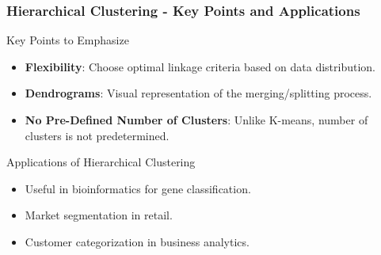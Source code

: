 \documentclass[aspectratio=169]{beamer}
\begin{document}
\begin{frame}[fragile]
  \frametitle{Hierarchical Clustering - Key Points and Applications}
  \begin{block}{Key Points to Emphasize}
    \begin{itemize}
      \item \textbf{Flexibility}: Choose optimal linkage criteria based on data distribution.
      \item \textbf{Dendrograms}: Visual representation of the merging/splitting process.
      \item \textbf{No Pre-Defined Number of Clusters}: Unlike K-means, number of clusters is not predetermined.
    \end{itemize}
  \end{block}

  \begin{block}{Applications of Hierarchical Clustering}
    \begin{itemize}
      \item Useful in bioinformatics for gene classification.
      \item Market segmentation in retail.
      \item Customer categorization in business analytics.
    \end{itemize}
  \end{block}
\end{frame}
\end{document}

